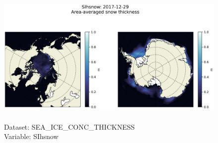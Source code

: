 \begin{figure}[H]
\centering
\includegraphics[scale=0.5]{../images/plots/latlon_plots/Sea-Ice_and_Snow_Concentration_and_Thickness/SIhsnow.png}
\caption{\\Dataset: SEA\_ICE\_CONC\_THICKNESS\\Variable: SIhsnow}
\label{tab:table-SEA_ICE_CONC_THICKNESS_SIhsnow-Plot}
\end{figure}
\pagebreak
